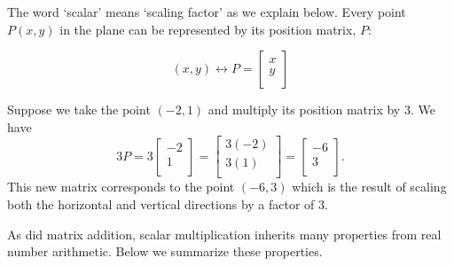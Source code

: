 \documentclass{ximera}
\begin{document}

\smallskip


The word  `scalar' means `scaling factor' as we  explain below.  Every point $P(x,y)$ in the plane can be represented by its position matrix, $P$:

\[ (x,y) \leftrightarrow P = \left[ \begin{array}{r} x \\ y \\ \end{array} \right] \]
 
Suppose we take the point $(-2,1)$ and multiply its position matrix by $3$.  We have\[ 3P = 3 \left[ \begin{array}{r} -2 \\ 1 \\ \end{array} \right] = \left[ \begin{array}{r} 3(-2) \\ 3(1) \\ \end{array} \right] = \left[ \begin{array}{r} -6 \\ 3 \\ \end{array} \right].\] This new matrix corresponds to the point $(-6,3)$ which is the result of scaling  both the horizontal and vertical directions by a factor of $3$. 


As did matrix addition, scalar multiplication inherits many properties from real number arithmetic.  Below we summarize these properties.
\end{document}
